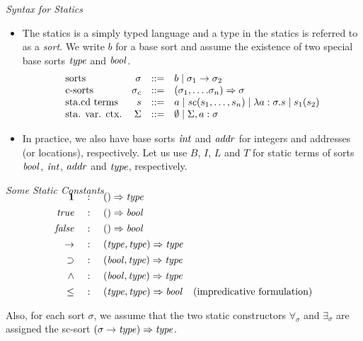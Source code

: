 \documentclass[pdf]{prosper}
\begin{document}
\def\saddr{{\it addr}}
\def\sbool{{\it bool}}
\def\simp{\rightarrow}
\def\Simp{\Rightarrow}
\def\sint{{\it int}}
\def\snat{{\it nat}}
\def\sprop{{\it prop}}
\def\stype{{\it type}}
\begin{slide}{{\em Syntax for Statics}}
\begin{itemize}
\item
The statics is a simply typed language and a type in the statics is
referred to as a {\em sort}. We write $b$ for a base sort and assume the
existence of two special base sorts $\stype$ and $\sbool$.
\[\begin{array}{lrcl}
\mbox{sorts} & \sigma & ::= & \basesort\mid\sigma_1\simp\sigma_2 \\
\mbox{c-sorts} & \sigma_c & ::= & (\sigma_1,\ldots.\sigma_n)\Simp\sigma \\
\mbox{sta.cd  terms} & s & ::= & a \mid \sc(s_1,\ldots,s_n) \mid \lambda a:\sigma.s \mid s_1(s_2) \\
\mbox{sta. var. ctx.} & \Sigma & ::= & \emptyset \mid \Sigma, a:\sigma \\
\end{array}\]
\item
In practice, we also have base sorts $\sint$ and $\saddr$ for integers and
addresses (or locations), respectively.  Let us use $B$, $I$, $L$ and $T$
for static terms of sorts $\sbool$, $\sint$, $\saddr$ and $\stype$,
respectively.
\end{itemize}
\end{slide}
\def\Band{\land}
\def\Bimp{\supset}
\def\ttrue{{\it true}}
\def\ffalse{{\it false}}
\def\timp{\rightarrow}
\def\Timp{\Rightarrow}
\def\tbool{\mbox{\bf bool}}
\def\tint{\mbox{\bf int}}
\def\tleq{\leq}
\def\tpjg{\vdash}
\def\tunit{{\mathbf 1}}
\begin{slide}{\em Some Static Constants}
\[\begin{array}{rcll}
\\[-24pt]
\tunit & ~:~ & ()\Simp \stype \\[4pt]
\ttrue & ~:~ & ()\Simp \sbool \\[4pt]
\ffalse & ~:~ & ()\Simp \sbool \\[4pt]

\timp & ~:~ & (\stype,\stype) \Simp \stype \\[4pt]
\Bimp & ~:~ & (\sbool,\stype) \Simp \stype \\[4pt]

\Band & ~:~ & (\sbool,\stype) \Simp \stype \\[4pt]
\tleq & ~:~ & (\stype,\stype) \Simp \sbool & \mbox{(impredicative formulation)}\\[4pt]
\end{array}\]
Also, for each sort $\sigma$, we assume that the two static constructors
$\forall_\sigma$ and $\exists_\sigma$ are assigned the sc-sort
$(\sigma\timp\stype)\Simp\stype$.
\vfill
\end{slide}
\end{document}
